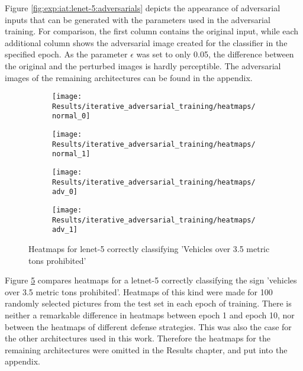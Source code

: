 \documentclass[draft,final]{vutinfth} %
\begin{document}
Figure \ref{fig:exp:iat:lenet-5:adversarials} depicts the appearance of adversarial inputs that can be generated with the parameters used in the adversarial training.
For comparison, the first column contains the original input, while each additional column shows the adversarial image created for the classifier in the specified epoch.
As the parameter $\epsilon$ was set to only 0.05, the difference between the original and the perturbed images is hardly perceptible.
The adversarial images of the remaining architectures can be found in the appendix. %



\begin{figure}[h]
	\begin{subfigure}[b]{0.5\columnwidth}
		\centering
    \texttt{[image: Results/iterative\_adversarial\_training/heatmaps/normal\_0]}
    \label{fig:exp:iat:lenet-5-heat:normal_0}
  \end{subfigure}
  \begin{subfigure}[b]{0.5\columnwidth}
		\centering
    \texttt{[image: Results/iterative\_adversarial\_training/heatmaps/normal\_1]}
    \label{fig:exp:iat:lenet-5-heat:normal_1}
  \end{subfigure}

	\begin{subfigure}[b]{0.5\columnwidth}
		\centering
    \texttt{[image: Results/iterative\_adversarial\_training/heatmaps/adv\_0]}
    \label{fig:exp:iat:lenet-5-heat:adv_0}
  \end{subfigure}
  \begin{subfigure}[b]{0.5\columnwidth}
		\centering
    \texttt{[image: Results/iterative\_adversarial\_training/heatmaps/adv\_1]}
    \label{fig:exp:iat:lenet-5-heat:adv_1}
  \end{subfigure}
  \caption{Heatmaps for lenet-5 correctly classifying 'Vehicles over 3.5 metric tons prohibited'}
	\label{fig:exp:iat:heatmap}
\end{figure}

Figure \ref{fig:exp:iat:heatmap} compares heatmaps for a letnet-5 correctly classifying the sign 'vehicles over 3.5 metric tons prohibited'.
Heatmaps of this kind were made for 100 randomly selected pictures from the test set in each epoch of training.
There is neither a remarkable difference in heatmaps between epoch 1 and epoch 10, nor between the heatmaps of different defense strategies.
This was also the case for the other architectures used in this work.
Therefore the heatmaps for the remaining architectures were omitted in the Results chapter, and put into the appendix.
\end{document}
